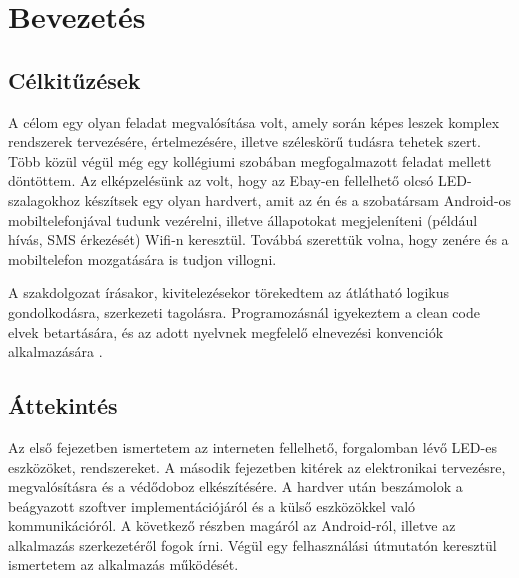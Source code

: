 \documentclass[../main.tex]{subfiles}
\begin{document}
\section{Bevezetés}
    \subsection{Célkitűzések}
        A célom egy olyan feladat megvalósítása volt, amely során képes leszek komplex rendszerek tervezésére, értelmezésére, illetve széleskörű tudásra tehetek szert. Több közül végül még egy kollégiumi szobában megfogalmazott feladat mellett döntöttem. 
        Az elképzelésünk az volt, hogy az Ebay-en fellelhető olcsó LED-szalagokhoz készítsek egy olyan hardvert, amit az én és a szobatársam Android-os mobiltelefonjával tudunk vezérelni, illetve állapotokat megjeleníteni (például hívás, SMS érkezését) Wifi-n keresztül. Továbbá szerettük volna, hogy zenére és a mobiltelefon mozgatására is tudjon villogni. 
        
        
        A szakdolgozat írásakor, kivitelezésekor törekedtem az átlátható logikus gondolkodásra, szerkezeti tagolásra. Programozásnál igyekeztem a clean code elvek betartására, és az adott nyelvnek megfelelő elnevezési konvenciók alkalmazására \cite{b_embedded_c_coding}\cite{b_programming_embedded_systems}\cite{android_clean_code}.
        
    \subsection{Áttekintés}
        Az első fejezetben ismertetem az interneten fellelhető, forgalomban lévő LED-es eszközöket, rendszereket.
        A második fejezetben kitérek az elektronikai tervezésre, megvalósításra és a védődoboz elkészítésére.
        A hardver után beszámolok a beágyazott szoftver implementációjáról és a külső eszközökkel való kommunikációról.
        A következő részben magáról az Android-ról, illetve az alkalmazás szerkezetéről fogok írni. Végül egy felhasználási útmutatón keresztül ismertetem az alkalmazás működését.
\end{document}
